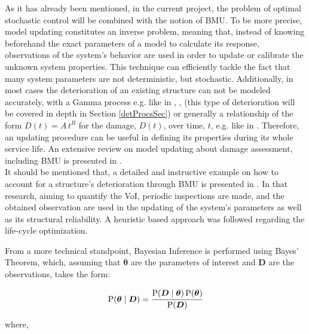 As it has already been mentioned, in the current project, the problem of optimal stochastic control will be combined with the notion of \gls{BMU}. To be more precise, model updating constitutes an inverse problem, meaning that, instead of knowing beforehand the exact parameters of a model to calculate its response, observations of the system's behavior are used in order to update or calibrate the unknown system properties. This technique can efficiently tackle the fact that many system parameters are not deterministic, but stochastic. Additionally, in most cases the deterioration of an existing structure can not be modeled accurately, with a Gamma process e.g. like in \cite{zhang2020deep}, \cite{andriotis2019managing}, \cite{zhou2022maintenance} (this type of deterioration will be covered in depth in Section \ref{detProcsSec}) or generally a relationship of the form $D(t) = A\, t^B$ for the damage, $D(t)$, over time, $t$, e.g. like in \cite{kamariotis2022value}. Therefore, an updating procedure can be useful in defining its properties during its whole service life. An extensive review on model updating about damage assessment, including \gls{BMU} is presented in \cite{simoen2015dealing}.\\

It should be mentioned that, a detailed and instructive example on how to account for a structure's deterioration through \gls{BMU} is presented in \cite{kamariotis2022value}. In that research, aiming to quantify the \gls{VoI}, periodic inspections are made, and the obtained observation are used in the updating of the system's parameters as well as its structural reliability. A heuristic based approach was followed regarding the life-cycle optimization.

\newpage

From a more technical standpoint, Bayesian Inference is performed using Bayes' Theorem, which, assuming that $\boldsymbol{\theta}$ are the parameters of interest and $\boldsymbol{D}$ are the observations, takes the form: 

\begin{equation}
    \text{P}(\boldsymbol{\theta}\mid \boldsymbol{D}) = \cfrac{\text{P}(\boldsymbol{D}\mid \boldsymbol{\theta}) \, \text{P}(\boldsymbol{\theta})}{\text{P}(\boldsymbol{D})} \label{bayesTheorem}
\end{equation}

where,

